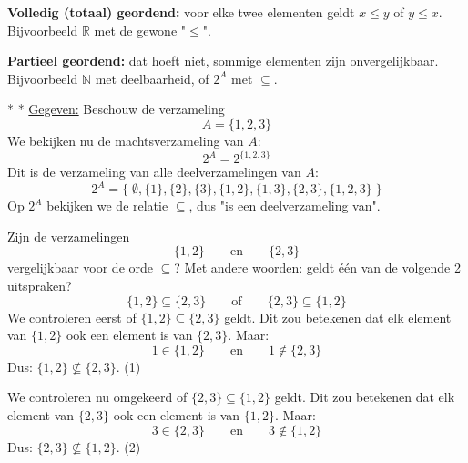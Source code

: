 \textbf{Volledig (totaal) geordend:} voor elke twee elementen geldt $x \le y$ of $y \le x$. Bijvoorbeeld $\mathbb{R}$ met de gewone "$\le$".

\textbf{Partieel geordend:} dat hoeft niet, sommige elementen zijn onvergelijkbaar. Bijvoorbeeld $\mathbb{N}$ met deelbaarheid, of $2^A$ met $\subseteq$.

\begin{niceexample}*
    \nextpart[]*
    \underline{Gegeven:} Beschouw de verzameling
    \begin{equation*}
        A = \{1,2,3\}
    \end{equation*}
    We bekijken nu de machtsverzameling van $A$:
    \begin{equation*}
        2^A = 2^{\{1,2,3\}}
    \end{equation*}
    Dit is de verzameling van alle deelverzamelingen van $A$:
    \begin{equation*}
        2^A = 
        \{\;
        \emptyset,
        \{1\},
        \{2\},
        \{3\},
        \{1,2\},
        \{1,3\},
        \{2,3\},
        \{1,2,3\}
        \;\}
    \end{equation*}
    Op $2^A$ bekijken we de relatie $\subseteq$, dus "is een deelverzameling van".

    \vspace{0.25cm}

     Zijn de verzamelingen 
    \begin{equation*}
        \{1,2\} \qquad \text{en} \qquad \{2,3\}
    \end{equation*}
    vergelijkbaar voor de orde $\subseteq$? Met andere woorden: geldt één van de volgende 2 uitspraken?
    \begin{equation*}
        \{1,2\} \subseteq \{2,3\} \qquad \text{of} \qquad \{2,3\} \subseteq \{1,2\}
    \end{equation*}
     We controleren eerst of $\{1,2\} \subseteq \{2,3\}$ geldt. Dit zou betekenen dat elk element van $\{1,2\}$ ook een element is van $\{2,3\}$. Maar:
    \begin{equation*}
        1 \in \{1,2\} \qquad \text{en} \qquad 1 \notin \{2,3\}
    \end{equation*}
    Dus: $\{1,2\} \nsubseteq \{2,3\}$. (1)

    \vspace{0.25cm}

    We controleren nu omgekeerd of $\{2,3\} \subseteq \{1,2\}$ geldt. Dit zou betekenen dat elk element van $\{2,3\}$ ook een element is van $\{1,2\}$. Maar:
    \begin{equation*}
        3 \in \{2,3\} \qquad \text{en} \qquad 3 \notin \{1,2\}
    \end{equation*}
    Dus: $\{2,3\} \nsubseteq \{1,2\}$. (2)


\end{niceexample}
